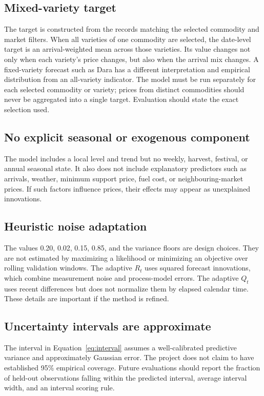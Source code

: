 \documentclass[12pt,a4paper,oneside]{report}
\numberwithin{equation}{chapter}
\numberwithin{figure}{chapter}
\numberwithin{table}{chapter}
\theoremstyle{definition}
\theoremstyle{plain}
\newcommand{\1}{\mathbf{1}}
\begin{document}
\subsection{Mixed-variety target}
The target is constructed from the records matching the selected commodity and market filters. When all varieties of one commodity are selected, the date-level target is an arrival-weighted mean across those varieties. Its value changes not only when each variety's price changes, but also when the arrival mix changes. A fixed-variety forecast such as Dara has a different interpretation and empirical distribution from an all-variety indicator. The model must be run separately for each selected commodity or variety; prices from distinct commodities should never be aggregated into a single target. Evaluation should state the exact selection used.

\subsection{No explicit seasonal or exogenous component}
The model includes a local level and trend but no weekly, harvest, festival, or annual seasonal state. It also does not include explanatory predictors such as arrivals, weather, minimum support price, fuel cost, or neighbouring-market prices. If such factors influence prices, their effects may appear as unexplained innovations.

\subsection{Heuristic noise adaptation}
The values 0.20, 0.02, 0.15, 0.85, and the variance floors are design choices. They are not estimated by maximizing a likelihood or minimizing an objective over rolling validation windows. The adaptive $R_t$ uses squared forecast innovations, which combine measurement noise and process-model errors. The adaptive $Q_t$ uses recent differences but does not normalize them by elapsed calendar time. These details are important if the method is refined.

\subsection{Uncertainty intervals are approximate}
The interval in Equation~\eqref{eq:interval} assumes a well-calibrated predictive variance and approximately Gaussian error. The project does not claim to have established 95\% empirical coverage. Future evaluations should report the fraction of held-out observations falling within the predicted interval, average interval width, and an interval scoring rule.
\end{document}

